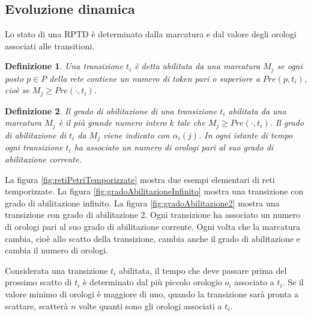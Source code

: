 \documentclass[a4paper]{report}
\newtheorem{definizione}{Definizione}
\begin{document}
\subsection{Evoluzione dinamica}
Lo stato di una RPTD \`e determinato dalla marcatura e dal valore
degli orologi associati alle transitioni.
\begin{definizione}
  Una transizione $t_i$ \`e detta abilitata da una marcatura $M_j$ se
  ogni posto $p \in P$ della rete contiene un numero di token pari o
  superiore a $Pre(p,t_i)$, cio\`e se $M_j \geq Pre(\cdot, t_i)$.
\end{definizione}
\begin{definizione}\label{def:gradoDiAbilitazion}
  Il grado di abilitazione di una transizione $t_i$ abilitata da una
  marcatura $M_j$ \`e il pi\`u grande numero intero $k$ tale che $M_j
  \geq Pre(\cdot, t_i)$. Il grado di abilitazione di $t_i$ da $M_j$
  viene indicato con $\alpha_i(j)$. In ogni istante di tempo ogni
  transizione $t_i$ ha associato un numero di orologi pari al suo
  grado di abilitazione corrente.
\end{definizione}

La figura \ref{fig:retiPetriTemporizzate} mostra due esempi elementari
di reti temporizzate. La figura \ref{fig:gradoAbilitazioneInfinito}
mostra una transizione con grado di abilitazione infinito. La figura
\ref{fig:gradoAbilitazione2} mostra una transizione con grado di
abilitazione 2. Ogni transizione ha associato un numero di orologi
pari al suo grado di abilitazione corrente. Ogni volta che la
marcatura cambia, cio\`e allo scatto della transizione, cambia anche
il grado di abilitazione e cambia il numero di orologi.

Considerata una transizione $t_i$ abilitata, il tempo che deve passare
prima del prossimo scatto di $t_i$ \`e determinato dal pi\`u piccolo
orologio $o_i$ associato a $t_i$. Se il valore minimo di orologi \`e
maggiore di uno, quando la transizione sar\`a pronta a scattare,
scatter\`a $n$ volte quanti sono gli orologi associati a $t_i$.
\end{document}
